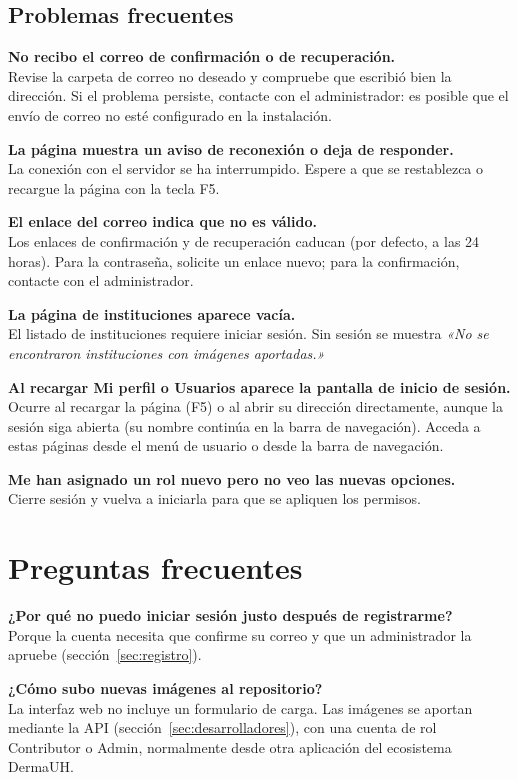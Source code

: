 \documentclass[11pt,a4paper]{article}
\newcommand{\seccion}[1]{\clearpage\section{#1}}
\newcommand{\menu}[1]{\textsf{\textbf{#1}}}
\newcommand{\mensaje}[1]{\textit{«#1»}}
\begin{document}
\subsection{Problemas frecuentes}

\textbf{No recibo el correo de confirmación o de recuperación.}\\
Revise la carpeta de correo no deseado y compruebe que escribió bien la
dirección. Si el problema persiste, contacte con el administrador: es posible que
el envío de correo no esté configurado en la instalación.

\textbf{La página muestra un aviso de reconexión o deja de responder.}\\
La conexión con el servidor se ha interrumpido. Espere a que se restablezca o
recargue la página con la tecla F5.

\textbf{El enlace del correo indica que no es válido.}\\
Los enlaces de confirmación y de recuperación caducan (por defecto, a las 24
horas). Para la contraseña, solicite un enlace nuevo; para la confirmación,
contacte con el administrador.

\textbf{La página de instituciones aparece vacía.}\\
El listado de instituciones requiere iniciar sesión. Sin sesión se muestra
\mensaje{No se encontraron instituciones con imágenes aportadas.}

\textbf{Al recargar \menu{Mi perfil} o \menu{Usuarios} aparece la pantalla de inicio
de sesión.}\\
Ocurre al recargar la página (F5) o al abrir su dirección directamente, aunque la
sesión siga abierta (su nombre continúa en la barra de navegación). Acceda a estas
páginas desde el menú de usuario o desde la barra de navegación.

\textbf{Me han asignado un rol nuevo pero no veo las nuevas opciones.}\\
Cierre sesión y vuelva a iniciarla para que se apliquen los permisos.

\seccion{Preguntas frecuentes}

\textbf{¿Por qué no puedo iniciar sesión justo después de registrarme?}\\
Porque la cuenta necesita que confirme su correo y que un administrador la
apruebe (sección~\ref{sec:registro}).

\textbf{¿Cómo subo nuevas imágenes al repositorio?}\\
La interfaz web no incluye un formulario de carga. Las imágenes se aportan mediante
la API (sección~\ref{sec:desarrolladores}), con una cuenta de rol Contributor o
Admin, normalmente desde otra aplicación del ecosistema DermaUH.
\end{document}
